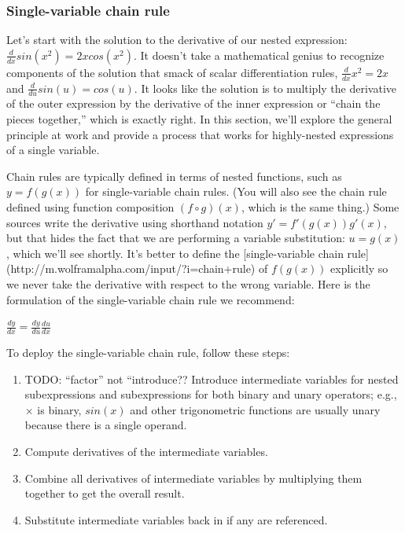 \documentclass[11pt]{article}
\begin{document}
\subsubsection{Single-variable chain rule}

Let's start with the solution to the derivative of our nested expression: $\frac{d}{dx} sin(x^2) = 2xcos(x^2)$.  It doesn't take a mathematical genius to recognize components of the solution that smack of scalar differentiation rules, $\frac{d}{dx}x^2 = 2x$ and $\frac{d}{du} sin(u) = cos(u)$. It looks like the solution is to multiply the derivative of the outer expression by the derivative of the inner expression or ``chain the pieces together,'' which is exactly right. In this section, we'll explore the general principle at work and provide a process that works for highly-nested expressions of a single variable.

Chain rules are typically defined in terms of nested functions, such as $y = f(g(x))$ for single-variable chain rules. (You will also see the chain rule defined using function composition $(f \circ g)(x)$, which is the same thing.)  Some sources write the derivative using shorthand notation $y' = f'(g(x))g'(x)$, but that hides the fact that we are performing a variable substitution: $u = g(x)$, which we'll see shortly. It's better to define the [single-variable chain rule](http://m.wolframalpha.com/input/?i=chain+rule) of $f(g(x))$ explicitly so we never take the derivative with respect to the wrong variable. Here is the formulation of the single-variable chain rule we recommend:

$\frac{dy}{dx} = \frac{dy}{du}\frac{du}{dx}$

To deploy the single-variable chain rule, follow these steps:

\begin{enumerate}
	\item  TODO: ``factor'' not ``introduce?? Introduce intermediate variables for nested subexpressions and subexpressions for both binary and unary operators; e.g., $\times$ is binary, $sin(x)$ and other trigonometric functions are usually unary because there is a single operand.
	\item Compute derivatives of the intermediate variables.
	\item Combine all derivatives of intermediate variables by multiplying them together to get the overall result.
	\item Substitute intermediate variables back in if any are referenced.
\end{enumerate}
\end{document}
